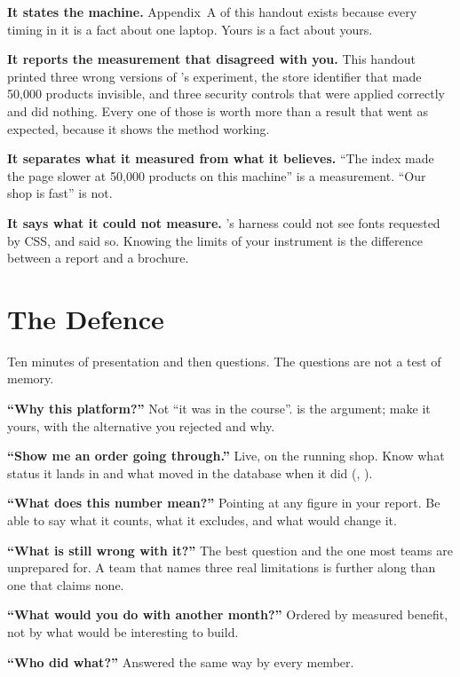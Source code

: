\begin{alertbox}
\textbf{It states the machine.} Appendix~A of this handout exists because every
timing in it is a fact about one laptop. Yours is a fact about yours.

\smallskip
\textbf{It reports the measurement that disagreed with you.} This handout
printed three wrong versions of 's experiment, the store
identifier that made 50{,}000 products invisible, and three security controls
that were applied correctly and did nothing. Every one of those is worth more
than a result that went as expected, because it shows the method working.

\smallskip
\textbf{It separates what it measured from what it believes.} ``The index made
the page slower at 50{,}000 products on this machine'' is a measurement. ``Our
shop is fast'' is not.

\smallskip
\textbf{It says what it could not measure.} 's harness could not see
fonts requested by CSS, and said so. Knowing the limits of your instrument is
the difference between a report and a brochure.
\end{alertbox}

\section{The Defence}

Ten minutes of presentation and then questions. The questions are not a test of
memory.

\begin{examplebox}
\begin{tight}
  \item \textbf{``Why this platform?''} Not ``it was in the course''.
         is the argument; make it yours, with the alternative
        you rejected and why.
  \item \textbf{``Show me an order going through.''} Live, on the running shop.
        Know what status it lands in and what moved in the database when it
        did (, ).
  \item \textbf{``What does this number mean?''} Pointing at any figure in your
        report. Be able to say what it counts, what it excludes, and what would
        change it.
  \item \textbf{``What is still wrong with it?''} The best question and the one
        most teams are unprepared for. A team that names three real
        limitations is further along than one that claims none.
  \item \textbf{``What would you do with another month?''} Ordered by measured
        benefit, not by what would be interesting to build.
  \item \textbf{``Who did what?''} Answered the same way by every member.
\end{tight}
\end{examplebox}

